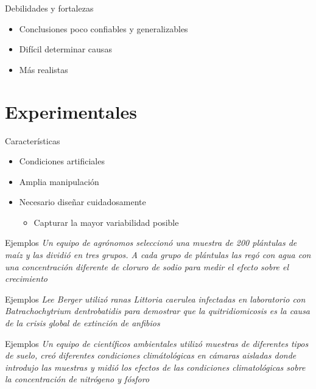 \documentclass[
  11pt,
  ignorenonframetext,
]{beamer}
\providecommand{\tightlist}{%
  \setlength{\itemsep}{0pt}\setlength{\parskip}{0pt}}
\begin{document}
\begin{frame}{Debilidades y fortalezas}
\protect\hypertarget{debilidades-y-fortalezas}{}
\begin{itemize}
\item
  Conclusiones poco confiables y generalizables
\item
  Difícil determinar causas
\item
  Más realistas
\end{itemize}
\end{frame}

\hypertarget{experimentales}{%
\section{Experimentales}\label{experimentales}}

\begin{frame}{Características}
\protect\hypertarget{caracteruxedsticas-1}{}
\begin{itemize}
\item
  Condiciones artificiales
\item
  Amplia manipulación
\item
  Necesario diseñar cuidadosamente

  \begin{itemize}
  \tightlist
  \item
    Capturar la mayor variabilidad posible
  \end{itemize}
\end{itemize}
\end{frame}

\begin{frame}{Ejemplos}
\protect\hypertarget{ejemplos-3}{}
\emph{Un equipo de agrónomos seleccionó una muestra de 200 plántulas de
maíz y las dividió en tres grupos. A cada grupo de plántulas las regó
con agua con una concentración diferente de cloruro de sodio para medir
el efecto sobre el crecimiento}
\end{frame}

\begin{frame}{Ejemplos}
\protect\hypertarget{ejemplos-4}{}
\emph{Lee Berger utilizó ranas Littoria caerulea infectadas en
laboratorio con Batrachochytrium dentrobatidis para demostrar que la
quitridiomicosis es la causa de la crisis global de extinción de
anfibios}
\end{frame}

\begin{frame}{Ejemplos}
\protect\hypertarget{ejemplos-5}{}
\emph{Un equipo de científicos ambientales utilizó muestras de
diferentes tipos de suelo, creó diferentes condiciones climátológicas en
cámaras aisladas donde introdujo las muestras y midió los efectos de las
condiciones climatológicas sobre la concentración de nitrógeno y
fósforo}
\end{frame}
\end{document}
